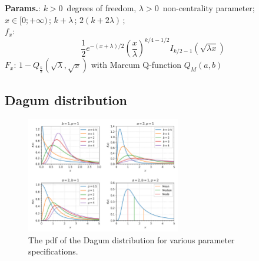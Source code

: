     {\color{darkblue} \textbf{Params.}:} {$k > 0\,$ degrees of freedom,  $\lambda > 0\,$ non-centrality parameter}; {$x \in [0; +\infty)\,$}; {$k+\lambda\,$}; {$2(k+2\lambda)\,$};\hspace{0.5cm}\\{\color{darkblue} \textbf{$f_x$}:} {$$\frac{1}{2}e^{-(x+\lambda)/2}\left (\frac{x}{\lambda} \right)^{k/4-1/2}
 I_{k/2-1}(\sqrt{\lambda x})$$}{\color{darkblue} \textbf{$F_x$}:} {$1 - Q_{\frac{k}{2}} \left( \sqrt{\lambda}, \sqrt{x} \right)$ with Marcum Q-function $Q_M(a,b)$}



    
        
\subsection{Dagum distribution}


    \begin{figure}[H]
        \centering
        \includegraphics[width=0.6\textwidth]{images/DagumPDF.png}
        \caption{The pdf of the Dagum distribution for various parameter specifications.}
    \end{figure}




